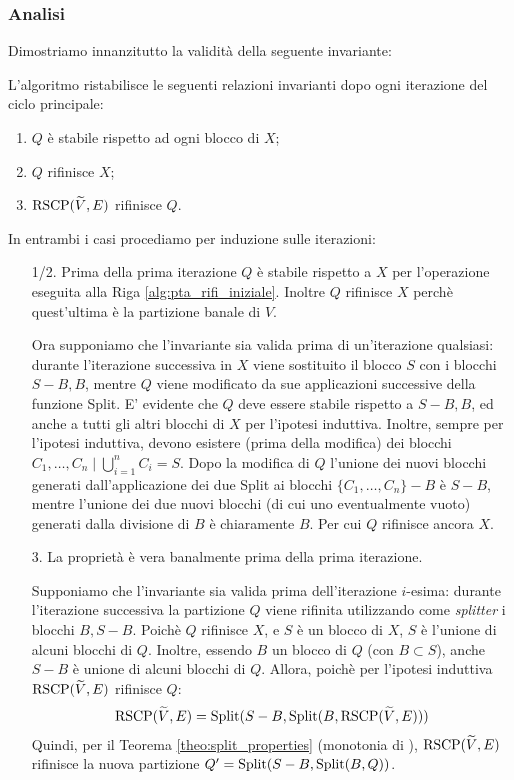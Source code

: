 \subsubsection{Analisi}
Dimostriamo innanzitutto la validità della seguente invariante:
\begin{lemma}
    \label{lem:pt_qx}
    L'algoritmo ristabilisce le seguenti relazioni invarianti dopo ogni iterazione del ciclo principale:
    \begin{enumerate}
        \item $Q$ è stabile rispetto ad ogni blocco di $X$;
        \item $Q$ rifinisce $X$;
        \item $\textup{RSCP}(\widetilde{V},E)$ rifinisce $Q$.
    \end{enumerate}
\end{lemma}
\begin{proof2}
    In entrambi i casi procediamo per induzione sulle iterazioni:
    \begin{itemize}
        \item[1/2.] Prima della prima iterazione $Q$ è stabile rispetto a $X$ per l'operazione eseguita alla Riga \ref{alg:pta_rifi_iniziale}. Inoltre $Q$ rifinisce $X$ perchè quest'ultima è la partizione banale di $V$.

        Ora supponiamo che l'invariante sia valida prima di un'iterazione qualsiasi: durante l'iterazione successiva in $X$ viene sostituito il blocco $S$ con i blocchi $S-B, B$, mentre $Q$ viene modificato da sue applicazioni successive della funzione Split. E' evidente che $Q$ deve essere stabile rispetto a $S-B, B$, ed anche a tutti gli altri blocchi di $X$ per l'ipotesi induttiva. Inoltre, sempre per l'ipotesi induttiva, devono esistere (prima della modifica) dei blocchi $C_1, \dots, C_n \mid \bigcup_{i=1}^n C_i = S$. Dopo la modifica di $Q$ l'unione dei nuovi blocchi generati dall'applicazione dei due Split ai blocchi $\{C_1, \dots, C_n\} - B$ è $S-B$, mentre l'unione dei due nuovi blocchi (di cui uno eventualmente vuoto) generati dalla divisione di $B$ è chiaramente $B$. Per cui $Q$ rifinisce ancora $X$.
        \item[3.] La proprietà è vera banalmente prima della prima iterazione.

        Supponiamo che l'invariante sia valida prima dell'iterazione $i$-esima: durante l'iterazione successiva la
        partizione $Q$ viene rifinita utilizzando come \emph{splitter} i blocchi $B, S-B$. Poichè $Q$ rifinisce $X$, e $S$ è un blocco di $X$, $S$ è l'unione di alcuni blocchi di $Q$. Inoltre, essendo $B$ un blocco di $Q$ (con $B \subset S$), anche $S-B$ è unione di alcuni blocchi di $Q$. Allora, poichè per l'ipotesi induttiva $\textup{RSCP}(\widetilde{V},E)$ rifinisce $Q$:
        \begin{gather*}
            \textup{RSCP}(\widetilde{V},E) = \textup{Split}(S-B, \textup{Split}(B, \textup{RSCP}(\widetilde{V},E)))
        \end{gather*}
        Quindi, per il Teorema \ref{theo:split_properties} (monotonia di \splitfunc), $\textup{RSCP}(\widetilde{V},E)$ rifinisce la nuova partizione $Q' = \textup{Split}(S-B, \textup{Split}(B, Q))$.
    \end{itemize}
    \vspace*{-0.75cm}
\end{proof2}
